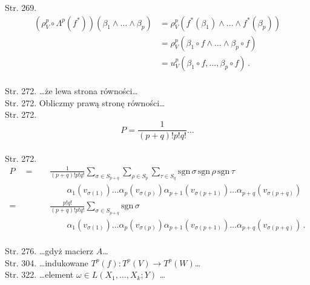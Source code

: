 \documentclass[a4paper,11pt]{article}
\begin{document}
Str. 269. \begin{displaymath}
  \begin{split}
    (\rho_{ V }^{ p } \circ \Lambda^{ p }( f^{ * } ) ) ( \beta_{ 1 } \wedge \ldots \wedge \beta_{ p } ) &= \rho_{ V }^{ p } ( f^{ * }( \beta_{ 1 } ) \wedge \ldots \wedge f^{ * } ( \beta_{ p } ) ) \\
                                                                    &= \rho_{ V }^{ p } (\beta_{ 1 } \circ f \wedge \ldots \wedge \beta_{ p } \circ f )\\
                                                                    &= u_{ V }^{ p } ( \beta_{ 1 } \circ f, \ldots, \beta_{ p } \circ f ) \, .
  \end{split}
\end{displaymath} \\
Str. 272. \ldots że lewa strona równości\ldots \\
Str. 272. Obliczmy prawą stronę równości\ldots \\
Str. 272. $$P = \frac{ 1 }{ ( p + q )! p! q! } \ldots$$ \\
Str. 272. \begin{displaymath}
  \begin{split}
    P \quad =& \quad \frac{ 1 }{ ( p + q )! p! q! } \sum_{ \sigma \in S_{ p + q } } \sum_{ \rho \in  S_{ p } } \sum_{ \tau \in S_{ q } } \textrm{sgn} \, \sigma \, \textrm{sgn} \, \rho \, \textrm{sgn} \, \tau \\
         & \quad \qquad \alpha_{ 1 } ( v_{ \sigma( 1 ) } ) \ldots \alpha_{ p } ( v_{ \sigma ( p ) } ) \alpha_{ p + 1 } ( v_{ \sigma( p + 1 ) } ) \ldots \alpha_{ p + q } ( v_{ \sigma ( p + q ) } ) \\
    = & \quad \frac{ p! q! }{ ( p + q )! p! q! } \sum_{ \sigma \in S_{ p + q } } \textrm{sgn} \, \sigma \\
         & \quad \qquad \alpha_{ 1 } ( v_{ \sigma( 1 ) } ) \ldots \alpha_{ p } ( v_{ \sigma ( p ) } ) \alpha_{ p
           + 1 } ( v_{ \sigma( p + 1 ) } ) \ldots \alpha_{ p + q } ( v_{ \sigma ( p + q ) } )
           \, .
  \end{split}
\end{displaymath} \\
Str. 276. \ldots gdyż macierz $A$\ldots \\
Str. 304. \ldots indukowane
$T^{ p } ( f ) : T^{ p } ( V ) \rightarrow T^{ p } (W)$\ldots \\
Str. 322. \ldots element $\omega \in L( X_{ 1 } ,\ldots, X_{ k }; Y )$ \ldots \\
\end{document}
